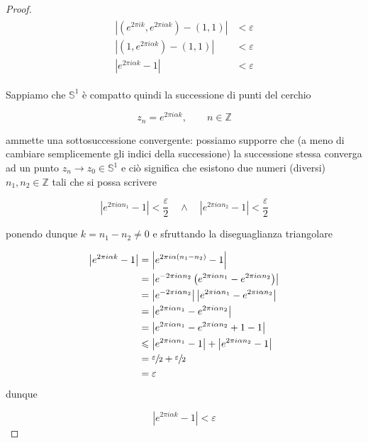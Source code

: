 \begin{proof}
	\begin{align}
		\begin{split}
			\left| (e^{2 \pi i k}, e^{2 \pi i \alpha k}) - (1,1) \right| &< \varepsilon\\
			\left| (1, e^{2 \pi i \alpha k}) - (1,1) \right| &< \varepsilon\\
			\left| e^{2 \pi i \alpha k} - 1 \right| &< \varepsilon
		\end{split}
	\end{align}

	Sappiamo che $ \mathbb{S}^{1} $ è compatto quindi la successione di punti del cerchio
	
	\begin{equation}
		z_{n} = e^{2 \pi i \alpha k}, \qquad n \in \mathbb{Z}
	\end{equation}

	ammette una sottosuccessione convergente: possiamo supporre che (a meno di cambiare semplicemente gli indici della successione) la successione stessa converga ad un punto $ z_{n} \to z_{0} \in \mathbb{S}^{1} $ e ciò significa che esistono due numeri (diversi) $ n_{1},n_{2} \in \mathbb{Z} $ tali che si possa scrivere
	
	\begin{equation}
		\left| e^{2 \pi i \alpha n_{1}} - 1 \right| < \dfrac{\varepsilon}{2} \quad \wedge \quad \left| e^{2 \pi i \alpha n_{2}} - 1 \right| < \dfrac{\varepsilon}{2}
	\end{equation}

	ponendo dunque $ k = n_{1} - n_{2} \neq 0 $ e sfruttando la diseguaglianza triangolare
	
	\begin{align}
		\begin{split}
			\left| e^{2 \pi i \alpha k} - 1 \right| &= \left| e^{2 \pi i \alpha (n_{1} - n_{2})} - 1 \right|\\
			&= \left| e^{ -2 \pi i \alpha n_{2}} \left( e^{2 \pi i \alpha n_{1}} - e^{2 \pi i \alpha n_{2}} \right) \right|\\
			&= \left| e^{ -2 \pi i \alpha n_{2}} \right| \left| e^{2 \pi i \alpha n_{1}} - e^{2 \pi i \alpha n_{2}} \right|\\
			&= \left| e^{2 \pi i \alpha n_{1}} - e^{2 \pi i \alpha n_{2}} \right|\\
			&= \left| e^{2 \pi i \alpha n_{1}} - e^{2 \pi i \alpha n_{2}} +1 -1 \right|\\
			&\leqslant \left| e^{2 \pi i \alpha n_{1}} - 1 \right| + \left| e^{2 \pi i \alpha n_{2}} - 1 \right|\\
			&= \sfrac{\varepsilon}{2} + \sfrac{\varepsilon}{2}\\
			&= \varepsilon
		\end{split}
	\end{align}

	dunque
	
	\begin{equation}
		\left| e^{2 \pi i \alpha k} - 1 \right| < \varepsilon
	\end{equation}
\end{proof}

